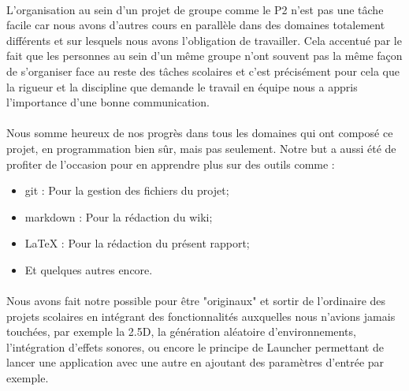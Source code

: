\documentclass[a4paper,10pt,openany,oneside]{report}
\begin{document}
\paragraph{}
L'organisation au sein d'un projet de groupe comme le P2 n'est pas une tâche facile car nous avons d'autres cours en parallèle dans des domaines totalement différents et sur lesquels nous avons l'obligation de travailler. Cela accentué par le fait que les personnes au sein d'un même groupe n'ont souvent pas la même façon de s'organiser face au reste des tâches scolaires et c'est précisément pour cela que la rigueur et la discipline que demande le travail en équipe nous a appris l'importance d'une bonne communication.
\paragraph{}
Nous somme heureux de nos progrès dans tous les domaines qui ont composé ce projet, en programmation bien sûr, mais pas seulement. Notre but a aussi été de profiter de l'occasion pour en apprendre plus sur des outils comme :
\begin{itemize}
\item git : Pour la gestion des fichiers du projet;
\item markdown : Pour la rédaction du wiki;
\item LaTeX : Pour la rédaction du présent rapport;
\item Et quelques autres encore.
\end{itemize}
\paragraph{}
Nous avons fait notre possible pour être "originaux" et sortir de l'ordinaire des projets scolaires en intégrant des fonctionnalités auxquelles nous n'avions jamais touchées, par exemple la 2.5D, la génération aléatoire d'environnements, l'intégration d'effets sonores, ou encore le principe de Launcher permettant de lancer une application avec une autre en ajoutant des paramètres d'entrée par exemple.
\end{document}
